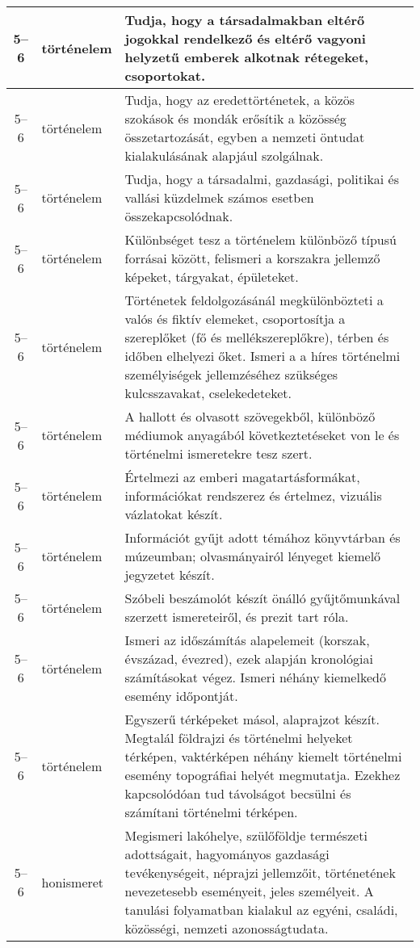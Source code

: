 \begin{small}
\begin{longtable}{c | p{2cm} |  p{11cm} }
              5--6 & történelem & Tudja, hogy a társadalmakban eltérő jogokkal rendelkező és eltérő vagyoni helyzetű emberek alkotnak rétegeket, csoportokat. \\ \hline
              5--6 & történelem & Tudja, hogy az eredettörténetek, a közös szokások és mondák erősítik a közösség összetartozását, egyben a nemzeti öntudat kialakulásának alapjául szolgálnak. \\ \hline
              5--6 & történelem & Tudja, hogy a társadalmi, gazdasági, politikai és vallási küzdelmek számos esetben összekapcsolódnak. \\ \hline
              5--6 & történelem & Különbséget tesz a történelem különböző típusú forrásai között, felismeri a korszakra jellemző képeket, tárgyakat, épületeket. \\ \hline
              5--6 & történelem & Történetek feldolgozásánál megkülönbözteti a valós és fiktív elemeket, csoportosítja a szereplőket (fő és mellékszereplőkre), térben és időben elhelyezi őket. Ismeri a a híres történelmi személyiségek jellemzéséhez szükséges kulcsszavakat, cselekedeteket. \\ \hline
              5--6 & történelem & A hallott és olvasott szövegekből, különböző médiumok anyagából következtetéseket von le és történelmi ismeretekre tesz szert. \\ \hline
              5--6 & történelem & Értelmezi az emberi magatartásformákat, információkat rendszerez és értelmez, vizuális vázlatokat készít. \\ \hline
              5--6 & történelem & Információt gyűjt adott témához könyvtárban és múzeumban; olvasmányairól lényeget kiemelő jegyzetet készít. \\ \hline
              5--6 & történelem & Szóbeli beszámolót készít önálló gyűjtőmunkával szerzett ismereteiről, és prezit tart róla. \\ \hline
              5--6 & történelem & Ismeri az időszámítás alapelemeit (korszak, évszázad, évezred), ezek alapján kronológiai számításokat végez. Ismeri néhány kiemelkedő esemény időpontját. \\ \hline
              5--6 & történelem & Egyszerű térképeket másol, alaprajzot készít. Megtalál földrajzi és történelmi helyeket térképen, vaktérképen néhány kiemelt történelmi esemény topográfiai helyét megmutatja. Ezekhez kapcsolódóan tud távolságot becsülni és számítani történelmi térképen. \\ \hline
              5--6 & honismeret & Megismeri lakóhelye, szülőföldje természeti adottságait, hagyományos gazdasági tevékenységeit, néprajzi jellemzőit, történetének nevezetesebb eseményeit, jeles személyeit. A tanulási folyamatban kialakul az egyéni, családi, közösségi, nemzeti azonosságtudata. \\ \hline

\end{longtable}
\end{small}
